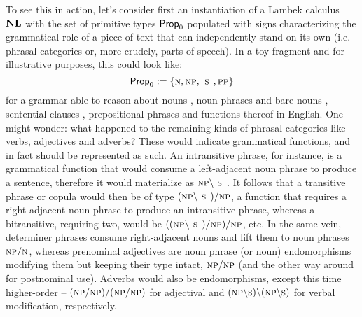 To see this in action, let's consider first an instantiation of a Lambek calculus $\textbf{NL}$ with the set of primitive types $\mathsf{Prop}_0$ populated with signs characterizing the grammatical role of a piece of text that can independently stand on its own (i.e. phrasal categories or, more crudely, parts of speech).
In a toy fragment and for illustrative purposes, this could look like:
\[
	\propcon := \{\smalln, \smallnp, \smallsmain, \smallpp\}
\]
for a grammar able to reason about nouns \smalln, noun phrases and bare nouns \smallnp{}, sentential clauses \smallsmain{}, prepositional phrases \smallpp{} and functions thereof in English.
One might wonder: what happened to the remaining kinds of phrasal categories like verbs, adjectives and adverbs?
These would indicate grammatical functions, and in fact should be represented as such.
An intransitive phrase, for instance, is a grammatical function that would consume a left-adjacent noun phrase to produce a sentence, therefore it would materialize as $\smallnp\divleft\smallsmain$.
It follows that a transitive phrase or copula would then be of type $(\smallnp\divleft\smallsmain)\divright\smallnp$, a function that requires a right-adjacent noun phrase to produce an intransitive phrase, whereas a bitransitive, requiring two, would be $((\smallnp\divleft\smallsmain)\divright\smallnp)\divright\smallnp$, etc.
In the same vein, determiner phrases consume right-adjacent nouns and lift them to noun phrases $\smallnp\divright\smalln$, whereas prenominal adjectives are noun phrase (or noun) endomorphisms modifying them but keeping their type intact, $\smallnp\divright\smallnp$ (and the other way around for postnominal use).
Adverbs would also be endomorphisms, except this time higher-order -- \linebreak$(\smallnp\divright\smallnp)\divright(\smallnp\divright\smallnp)$ for adjectival and $(\smallnp\divleft\smalls)\divleft(\smallnp\divleft\smalls)$ for verbal modification, respectively.

